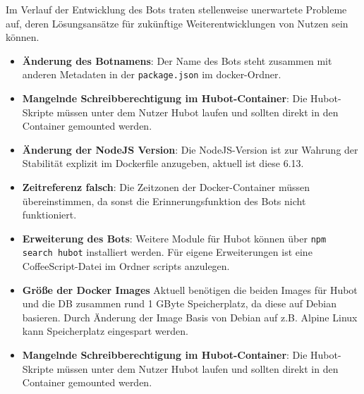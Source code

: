 Im Verlauf der Entwicklung des Bots traten stellenweise unerwartete Probleme auf, deren Lösungsansätze für zukünftige Weiterentwicklungen von Nutzen sein können.
\begin{itemize}
    \item \textbf{Änderung des Botnamens}: Der Name des Bots steht zusammen mit anderen Metadaten in der \texttt{package.json} im docker-Ordner.
    \item \textbf{Mangelnde Schreibberechtigung im Hubot-Container}: Die Hubot-Skripte müssen unter dem Nutzer Hubot laufen und sollten direkt in den Container gemounted werden.
    \item \textbf{Änderung der NodeJS Version}: Die NodeJS-Version ist zur Wahrung der Stabilität explizit im Dockerfile anzugeben, aktuell ist diese 6.13.
    \item \textbf{Zeitreferenz falsch}: Die Zeitzonen der Docker-Container müssen übereinstimmen, da sonst die Erinnerungsfunktion des Bots nicht funktioniert.
    \item \textbf{Erweiterung des Bots}: Weitere Module für Hubot können über \texttt{npm search hubot} installiert werden. Für eigene Erweiterungen ist eine CoffeeScript-Datei im Ordner scripts anzulegen.
    \item \textbf{Größe der Docker Images} Aktuell benötigen die beiden Images für Hubot und die DB zusammen rund 1 GByte Speicherplatz, da diese auf Debian basieren. Durch Änderung der Image Basis von Debian auf z.B. Alpine Linux kann Speicherplatz eingespart werden.
    \item \textbf{Mangelnde Schreibberechtigung im Hubot-Container}: Die Hubot-Skripte müssen unter dem Nutzer Hubot laufen und sollten direkt in den Container gemounted werden.

\end{itemize}
